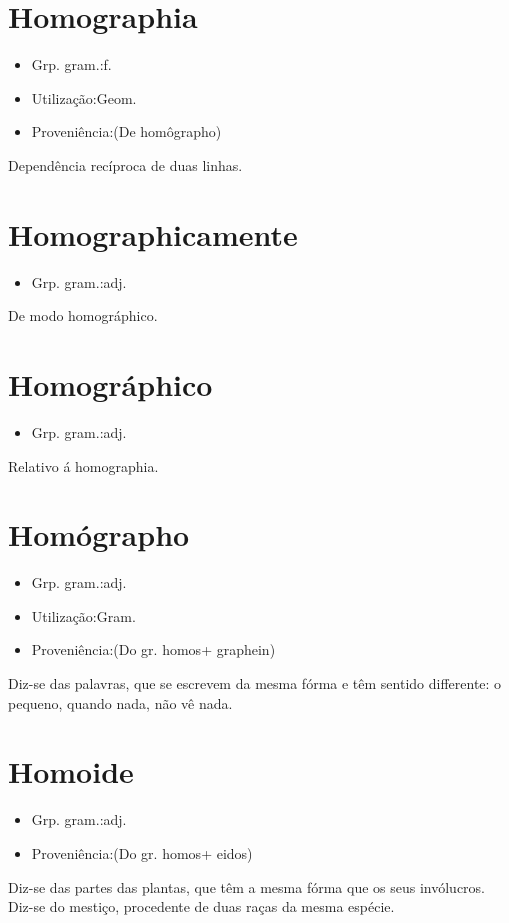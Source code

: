 \documentclass{article}
\begin{document}
\section{Homographia}
\begin{itemize}
\item {Grp. gram.:f.}
\end{itemize}
\begin{itemize}
\item {Utilização:Geom.}
\end{itemize}
\begin{itemize}
\item {Proveniência:(De \textunderscore homôgrapho\textunderscore )}
\end{itemize}
Dependência recíproca de duas linhas.
\section{Homographicamente}
\begin{itemize}
\item {Grp. gram.:adj.}
\end{itemize}
De modo homográphico.
\section{Homográphico}
\begin{itemize}
\item {Grp. gram.:adj.}
\end{itemize}
Relativo á homographia.
\section{Homógrapho}
\begin{itemize}
\item {Grp. gram.:adj.}
\end{itemize}
\begin{itemize}
\item {Utilização:Gram.}
\end{itemize}
\begin{itemize}
\item {Proveniência:(Do gr. \textunderscore homos\textunderscore  + \textunderscore graphein\textunderscore )}
\end{itemize}
Diz-se das palavras, que se escrevem da mesma fórma e têm sentido differente: \textunderscore o pequeno, quando nada, não vê nada\textunderscore .
\section{Homoide}
\begin{itemize}
\item {Grp. gram.:adj.}
\end{itemize}
\begin{itemize}
\item {Proveniência:(Do gr. \textunderscore homos\textunderscore  + \textunderscore eidos\textunderscore )}
\end{itemize}
Diz-se das partes das plantas, que têm a mesma fórma que os seus invólucros.
Diz-se do mestiço, procedente de duas raças da mesma espécie.
\end{document}
